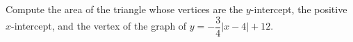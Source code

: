 Compute the area of the triangle whose vertices are the $y$-intercept, the positive $x$-intercept, and the vertex of the graph of $y=-\dfrac{3}{4}|x-4|+12$.
